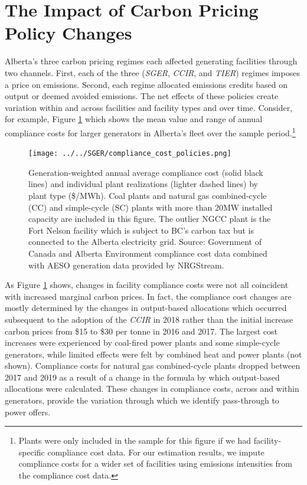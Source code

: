 \documentclass[12pt]{article}
\newcommand{\coe}{\text{CO$_2$e }}
\begin{document}
\section{The Impact of Carbon Pricing Policy Changes}

Alberta's three carbon pricing regimes each affected generating facilities through two channels. First, each of the three (\emph{SGER}, \emph{CCIR}, and \emph{TIER}) regimes imposes a price on emissions. Second, each regime allocated emissions credits based on output or deemed avoided emissions. The net effects of these policies create variation within and across facilities and facility types and over time.  Consider, for example, Figure \ref{fig:sector_compliance_cost} which shows the mean value and range of annual compliance costs for larger generators in Alberta's fleet over the sample period.\footnote{Plants were only included in the sample for this figure if we had facility-specific compliance cost data. For our estimation results, we impute compliance costs for a wider set of facilities using emissions intensities from the compliance cost data.}

\begin{figure}[t]%
	\centering \vspace{-.25cm} \texttt{[image: ../../SGER/compliance\_cost\_policies.png]}
\vspace{-0.75cm}	\caption{Generation-weighted annual average compliance cost (solid black lines) and individual plant realizations (lighter dashed lines) by plant type (\$/MWh). Coal plants and natural gas combined-cycle (CC) and simple-cycle (SC) plants with more than 20MW installed capacity are included in this figure. The outlier NGCC plant is the Fort Nelson facility which is subject to BC's carbon tax but is connected to the Alberta electricity grid. Source: Government of Canada and Alberta Environment compliance cost data combined with AESO generation data provided by NRGStream.}
\label{fig:sector_compliance_cost}
\end{figure}

As Figure \ref{fig:sector_compliance_cost} shows, changes in facility compliance costs were not all coincident with increased marginal carbon prices. In fact, the compliance cost changes are mostly determined  by the changes in output-based allocations which occurred subsequent to the adoption of the \emph{CCIR} in 2018 rather than the initial increase carbon prices from \$15 to \$30 per tonne \coe in 2016 and 2017. The largest cost increases were experienced by coal-fired power plants and some simple-cycle generators, while limited effects were felt by combined heat and power plants (not shown). Compliance costs for natural gas combined-cycle plants dropped between 2017 and 2019 as a result of a change in the formula by which output-based allocations were calculated. These changes in compliance costs, across and within generators, provide the variation through which we identify pass-through to power offers.
\end{document}
